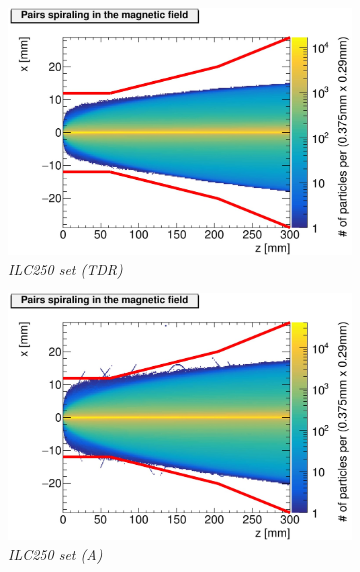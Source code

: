 \begin{figure}
\centering
\begin{subfigure}[t]{0.49\textwidth}
\centering
\includegraphics[width=\textwidth]{figures/Helix_tracks_xz_100bunches_250GeV_5T_DanielJeans-1.jpg}
\caption{\textit{ILC250 set (TDR)}}
\end{subfigure}
\hspace*{0.08cm}
\begin{subfigure}[t]{0.49\textwidth}
\centering
\includegraphics[width=\textwidth]{figures/Helix_tracks_xz_80bunches_250GeV_5T_Reduced_Emittance_x-1.jpg}
\caption{\textit{ILC250 set (A)}}
\end{subfigure}
\\
\begin{subfigure}[t]{0.49\textwidth}
\centering

\end{subfigure}
\end{figure}
